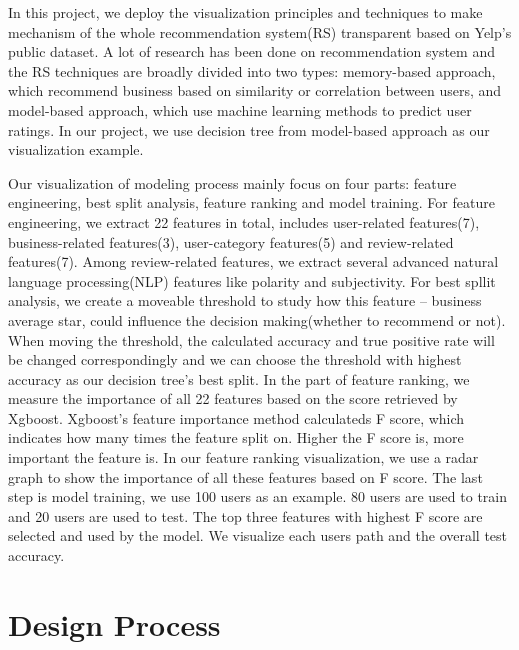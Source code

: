 \documentclass{vgtc}                          %
\begin{document}
In this project, we deploy the visualization principles and techniques to make mechanism of the whole recommendation system(RS) transparent based on Yelp's public dataset\cite{yelpdata}. A lot of research has been done on recommendation system and the RS techniques are broadly divided into two types: memory-based approach, which recommend business based on similarity or correlation between users\cite{sarwar2001item}, and model-based approach, which use machine learning methods to predict user ratings\cite{portugal2017use}. In our project, we use decision tree from model-based approach\cite{cho2002personalized} as our visualization example. 

Our visualization of modeling process mainly focus on four parts: feature engineering, best split analysis, feature ranking and model training. For feature engineering, we extract 22 features in total, includes user-related features(7), business-related features(3), user-category features(5) and review-related features(7). Among review-related features, we extract several advanced natural language processing(NLP) features like polarity\cite{das2012sentimantics} and subjectivity\cite{montoyo2012subjectivity}. For best spllit analysis, we create a moveable threshold to study how this feature -- business average star, could influence the decision making(whether to recommend or not). When moving the threshold, the calculated accuracy and true positive rate\cite{spackman1989signal} will be changed correspondingly and we can choose the threshold with highest accuracy as our decision tree's best split. In the part of feature ranking, we measure the importance of all 22 features based on the score retrieved by Xgboost\cite{chen2016xgboost}. Xgboost's feature importance method calculateds F score, which indicates how many times the feature split on. Higher the F score is, more important the feature is. In our feature ranking visualization, we use a radar graph to show the importance of all these features based on F score. The last step is model training, we use 100 users as an example. 80 users are used to train and 20 users are used to test. The top three features with highest F score are selected and used by the model. We visualize each users path and the overall test accuracy.

\section{Design Process}
\end{document}
